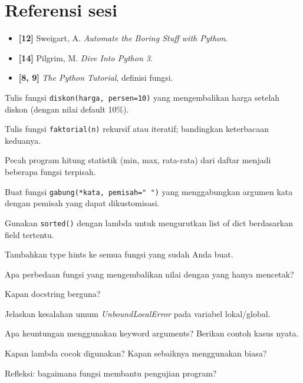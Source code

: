 ﻿\documentclass[../main.tex]{subfiles}
\begin{document}
\section{Referensi sesi}

\begin{itemize}[leftmargin=*]
  \item \textbf{[12]} Sweigart, A. \textit{Automate the Boring Stuff with Python}.
  \item \textbf{[14]} Pilgrim, M. \textit{Dive Into Python 3}.
  \item \textbf{[8, 9]} \textit{The Python Tutorial}, definisi fungsi.
\end{itemize}

\begin{aktivitas}
  \item Tulis fungsi \texttt{diskon(harga, persen=10)} yang mengembalikan harga setelah diskon (dengan nilai default 10\%).
  \item Tulis fungsi \texttt{faktorial(n)} rekursif atau iteratif; bandingkan keterbacaan keduanya.
  \item Pecah program hitung statistik (min, max, rata-rata) dari daftar menjadi beberapa fungsi terpisah.
  \item Buat fungsi \texttt{gabung(*kata, pemisah=" ")} yang menggabungkan argumen kata dengan pemisah yang dapat dikustomisasi.
  \item Gunakan \texttt{sorted()} dengan lambda untuk mengurutkan list of dict berdasarkan field tertentu.
  \item Tambahkan type hints ke semua fungsi yang sudah Anda buat.
\end{aktivitas}

\begin{latihan}
  \item Apa perbedaan fungsi yang mengembalikan nilai dengan yang hanya mencetak?
  \item Kapan docstring berguna?
  \item Jelaskan kesalahan umum \textit{UnboundLocalError} pada variabel lokal/global.
  \item Apa keuntungan menggunakan keyword arguments? Berikan contoh kasus nyata.
  \item Kapan lambda cocok digunakan? Kapan sebaiknya menggunakan  biasa?
  \item Refleksi: bagaimana fungsi membantu pengujian program?
\end{latihan}
\end{document}
